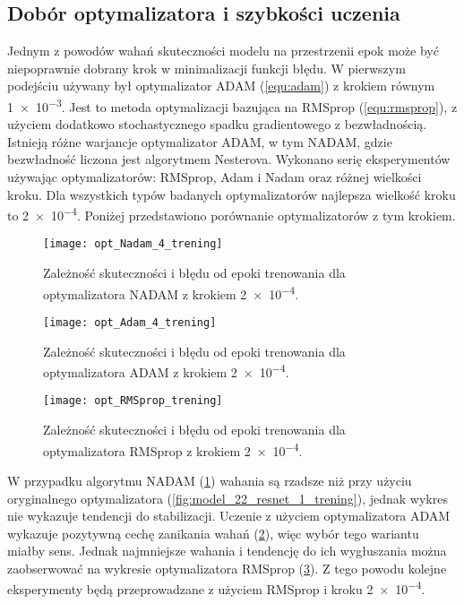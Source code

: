 \subsection{Dobór optymalizatora i szybkości uczenia}

Jednym z powodów wahań skuteczności modelu na przestrzenii epok może być niepoprawnie dobrany krok w minimalizacji funkcji błędu. W pierwszym podejściu używany był optymalizator ADAM (\ref{equ:adam}) z krokiem równym \num{1e-3}. Jest to metoda optymalizacji bazująca na RMSprop (\ref{equ:rmsprop}), z użyciem dodatkowo stochastycznego spadku gradientowego z bezwładnością. Istnieją różne warjancje optymalizator ADAM, w tym NADAM, gdzie bezwładność liczona jest algorytmem Nesterova. Wykonano serię eksperymentów używając optymalizatorów: RMSprop, Adam i Nadam oraz różnej wielkości kroku. Dla wszystkich typów badanych optymalizatorów najlepsza wielkość kroku to \num{2e-4}. Poniżej przedstawiono porównanie optymalizatorów z tym krokiem.

\begin{figure}[h!]
	\centering
	\centering
		\texttt{[image: opt\_Nadam\_4\_trening]}	
	\caption{Zależność skuteczności i błędu od epoki trenowania dla optymalizatora NADAM z krokiem \num{2e-4}.}	\label{fig:opt_Nadam_4_trening}
\end{figure}

\begin{figure}[h!]
	\centering
	\centering
		\texttt{[image: opt\_Adam\_4\_trening]}	
	\caption{Zależność skuteczności i błędu od epoki trenowania dla optymalizatora ADAM z krokiem \num{2e-4}.}	\label{fig:opt_Adam_4_trening}
\end{figure}

\begin{figure}[h!]
	\centering
	\centering
		\texttt{[image: opt\_RMSprop\_trening]}	
	\caption{Zależność skuteczności i błędu od epoki trenowania dla optymalizatora RMSprop z krokiem \num{2e-4}.}	\label{fig:opt_RMSprop_trening}
\end{figure}
{\parindent0pt
W przypadku algorytmu NADAM (\ref{fig:opt_Nadam_4_trening}) wahania są rzadsze niż przy użyciu oryginalnego optymalizatora (\ref{fig:model_22_resnet_1_trening}), jednak wykres nie wykazuje tendencji do stabilizacji. Uczenie z użyciem optymalizatora ADAM wykazuje pozytywną cechę zanikania wahań (\ref{fig:opt_Adam_4_trening}), więc wybór tego wariantu miałby sens. Jednak najmniejsze wahania i tendencję do ich wygłuszania można zaobserwować na wykresie optymalizatora RMSprop (\ref{fig:opt_RMSprop_trening}). Z tego powodu kolejne eksperymenty będą przeprowadzane z użyciem RMSprop i kroku \num{2e-4}.
}

